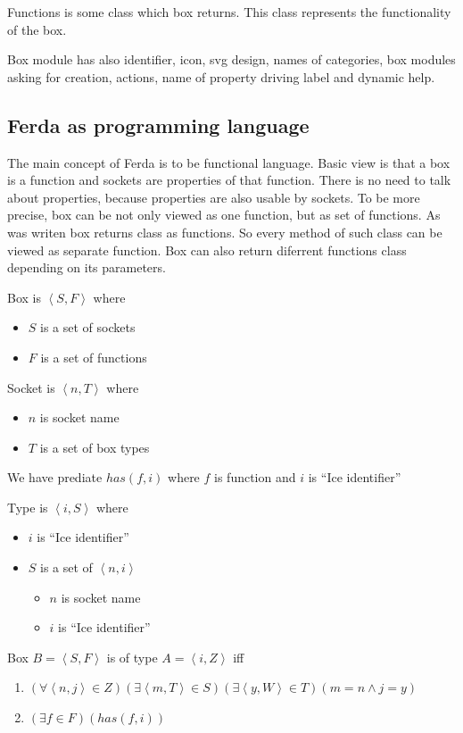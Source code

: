 \documentclass{article}
\begin{document}
Functions is some class which box returns. This class represents the functionality of the box.

Box module has also identifier, icon, svg design, names of categories, box modules asking for creation, actions, name of property driving label and dynamic help.

\subsection{Ferda as programming language}
The main concept of Ferda is to be functional language. Basic view is that a box is a function and sockets are properties of that function. There is no need to talk about properties, because properties are also usable by sockets. To be more precise, box can be not only viewed as one function, but as set of functions. As was writen box returns class as functions. So every method of such class can be viewed as separate function. Box can also return diferrent functions class depending on its parameters. 

Box is $\left<S,F\right>$ where
\begin{itemize}
	\item $S$ is a set of sockets
	\item $F$ is a set of functions
\end{itemize}
	
Socket is $\left<n,T\right>$ where
\begin{itemize}
	\item $n$ is socket name
	\item $T$ is a set of box types
\end{itemize}

We have prediate $has(f,i)$ where $f$ is function and $i$ is ``Ice identifier''

Type is $\left<i,S\right>$ where
\begin{itemize}
	\item $i$ is ``Ice identifier''
	\item $S$ is a set of $\left<n,i\right>$
	\begin{itemize}
		\item $n$ is socket name
		\item $i$ is ``Ice identifier''
	\end{itemize}
\end{itemize}

Box $B=\left<S,F\right>$ is of type $A=\left<i,Z\right>$ iff 
\begin{enumerate}
	\item $(\forall \left<n,j\right>\in Z)(\exists \left<m,T\right>\in S)(\exists \left<y,W\right>\in T)(m=n \wedge j=y)$
	\item $(\exists f\in F)(has(f,i))$
\end{enumerate}
	
\end{document}
